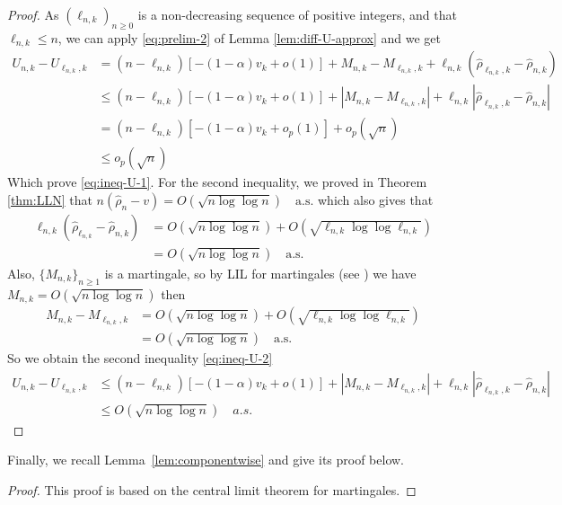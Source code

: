 \documentclass[11pt]{article}
\theoremstyle{plain}
\theoremstyle{definition}
\begin{document}
\begin{appendix}
\begin{proof}
	As \(\left(\ell_{n,k}\right)_{n \geq 0}\) is a non-decreasing sequence of positive integers, and that \(\ell_{n,k} \leq n\), we can apply \eqref{eq:prelim-2} of Lemma \ref{lem:diff-U-approx} and we get
	\begin{align*}
		U_{n,k} - U_{\ell_{n,k},k} &= (n - \ell_{n,k})[-(1 - \alpha)v_k + o(1)] + M_{n,k} - M_{\ell_{n,k},k} + \ell_{n,k} (\hat{\rho}_{\ell_{n,k},k} - \hat{\rho}_{n,k})\\
		&\leq (n - \ell_{n,k})[-(1 - \alpha)v_k + o(1)] + |M_{n,k} - M_{\ell_{n,k},k}| + \ell_{n,k} |\hat{\rho}_{\ell_{n,k},k} - \hat{\rho}_{n,k}|\\
		&= (n - \ell_{n,k})[-(1 - \alpha)v_k + o_p(1)] + o_p(\sqrt{n})\\
		&\leq o_p(\sqrt{n}) 
	\end{align*}
	Which prove \eqref{eq:ineq-U-1}. For the second inequality, we proved in Theorem \ref{thm:LLN} that \(n(\hat{\rho}_n - v) = O\left(\sqrt{n \log \log n}\right) \quad \text{a.s.}\) which also gives that
	\begin{align*}
		\ell_{n,k}(\hat{\rho}_{\ell_{n,k}} - \hat{\rho}_{n,k}) &= O\left(\sqrt{n \log \log n}\right) + O\left(\sqrt{\ell_{n,k} \log \log \ell_{n,k}}\right) \\
		&= O\left(\sqrt{n \log \log n}\right) \quad \text{a.s.}
	\end{align*}
	Also, $\{M_{n,k}\}_{n \geq 1}$ is a martingale, so by LIL for martingales (see \cite{Stout1970}) we have \(M_{n,k} = O\left(\sqrt{n \log\!\log n}\right)\) then
	\begin{align*}
		M_{n,k} - M_{\ell_{n,k},k} &= O\left(\sqrt{n \log\!\log n}\right) + O\left(\sqrt{\ell_{n,k} \log\!\log \ell_{n,k}}\right)\\
		&= O\left(\sqrt{n \log\!\log n}\right) \quad \text{a.s.}
	\end{align*}
	So we obtain the second inequality \eqref{eq:ineq-U-2}
	\begin{align*}
		U_{n,k} - U_{\ell_{n,k},k} &\leq (n - \ell_{n,k})[-(1 - \alpha)v_k + o(1)] + |M_{n,k} - M_{\ell_{n,k},k}| + \ell_{n,k} |\hat{\rho}_{\ell_{n,k},k} - \hat{\rho}_{n,k}|\\			
		&\leq O\left(\sqrt{n \log \log n}\right) \quad a.s.
	\end{align*}
\end{proof}

Finally, we recall Lemma~\ref{lem:componentwise} and give its proof below.

\jointcltlemma*
\begin{proof}
	This proof is based on the central limit theorem for martingales.
	

\end{proof}
\end{appendix}
\end{document}
